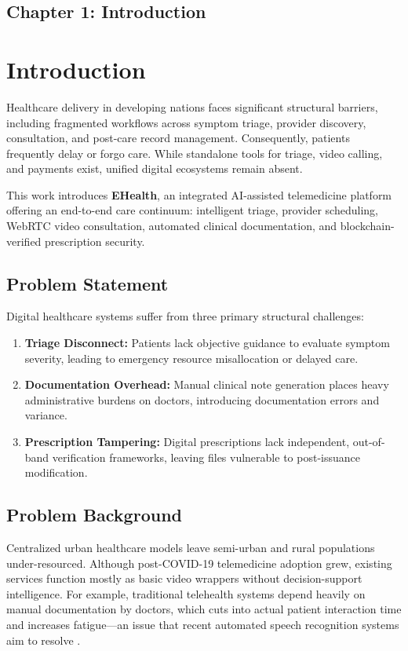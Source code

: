 \begin{center}
    \section*{\fontsize{16}{16}\selectfont Chapter 1: Introduction}
\end{center}
\vspace{-2mm}

\section{Introduction}
Healthcare delivery in developing nations faces significant structural barriers, including fragmented workflows across symptom triage, provider discovery, consultation, and post-care record management. Consequently, patients frequently delay or forgo care. While standalone tools for triage, video calling, and payments exist, unified digital ecosystems remain absent. 

\noindent This work introduces \textbf{EHealth}, an integrated AI-assisted telemedicine platform offering an end-to-end care continuum: intelligent triage, provider scheduling, WebRTC video consultation, automated clinical documentation, and blockchain-verified prescription security.

\subsection{Problem Statement}
Digital healthcare systems suffer from three primary structural challenges:
\begin{enumerate}
    \setlength{\itemsep}{1pt}
    \setlength{\parskip}{0pt}
    \item \textbf{Triage Disconnect:} Patients lack objective guidance to evaluate symptom severity, leading to emergency resource misallocation or delayed care.
    \item \textbf{Documentation Overhead:} Manual clinical note generation places heavy administrative burdens on doctors, introducing documentation errors and variance.
    \item \textbf{Prescription Tampering:} Digital prescriptions lack independent, out-of-band verification frameworks, leaving files vulnerable to post-issuance modification.
\end{enumerate}

\subsection{Problem Background}
Centralized urban healthcare models leave semi-urban and rural populations under-resourced. Although post-COVID-19 telemedicine adoption grew, existing services function mostly as basic video wrappers without decision-support intelligence. For example, traditional telehealth systems depend heavily on manual documentation by doctors, which cuts into actual patient interaction time and increases fatigue—an issue that recent automated speech recognition systems aim to resolve \cite{asr_healthcare_2026, asr_llm_benchmarking_2025}. 

